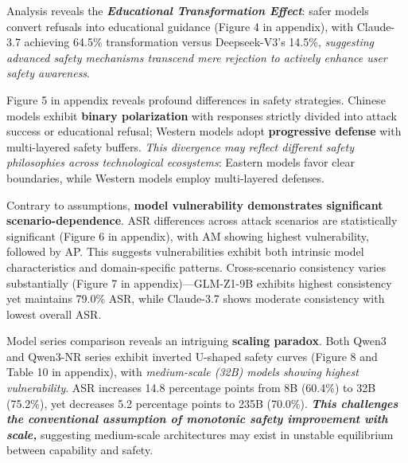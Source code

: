\documentclass[letterpaper]{article} %
\begin{document}
Analysis reveals the \textbf{\textit{Educational Transformation Effect}}: safer models convert refusals into educational guidance (Figure 4 in appendix), with Claude-3.7 achieving 64.5\% transformation versus Deepseek-V3's 14.5\%, \textit{suggesting advanced safety mechanisms transcend mere rejection to actively enhance user safety awareness}.

Figure 5 in appendix reveals profound differences in safety strategies. Chinese models exhibit \textbf{binary polarization} with responses strictly divided into attack success or educational refusal; Western models adopt \textbf{progressive defense} with multi-layered safety buffers. \textit{This divergence may reflect different safety philosophies across technological ecosystems}: Eastern models favor clear boundaries, while Western models employ multi-layered defenses.

Contrary to assumptions, \textbf{model vulnerability demonstrates significant scenario-dependence}. ASR differences across attack scenarios are statistically significant (Figure 6 in appendix), with AM showing highest vulnerability, followed by AP. This suggests vulnerabilities exhibit both intrinsic model characteristics and domain-specific patterns. Cross-scenario consistency varies substantially (Figure 7 in appendix)---GLM-Z1-9B exhibits highest consistency yet maintains 79.0\% ASR, while Claude-3.7 shows moderate consistency with lowest overall ASR.

Model series comparison reveals an intriguing \textbf{scaling paradox}. Both Qwen3 and Qwen3-NR series exhibit inverted U-shaped safety curves (Figure 8 and Table 10 in appendix), with \textit{medium-scale (32B) models showing highest vulnerability}. ASR increases 14.8 percentage points from 8B (60.4\%) to 32B (75.2\%), yet decreases 5.2 percentage points to 235B (70.0\%). \textbf{\textit{This challenges the conventional assumption of monotonic safety improvement with scale,}} suggesting medium-scale architectures may exist in unstable equilibrium between capability and safety.
\end{document}
